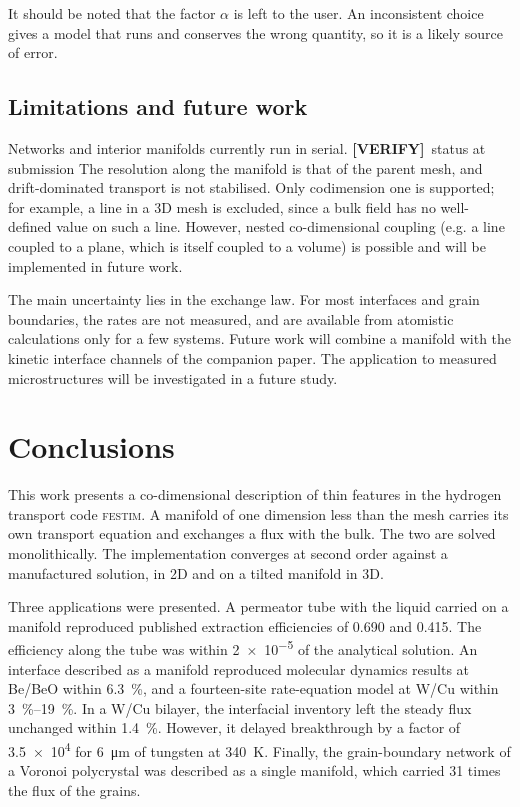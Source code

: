 \documentclass[5p]{elsarticle}
\newcommand{\FESTIM}{\textsc{festim}}
\newcommand{\VERIFY}[1]{\textcolor{RedOrange}{\textbf{[VERIFY]}~#1}}
\begin{document}
It should be noted that the factor $\alpha$ is left to the user.
An inconsistent choice gives a model that runs and conserves the wrong quantity, so it is a likely source of error.

\subsection{Limitations and future work}
\label{sec:discussion:limitations}

Networks and interior manifolds currently run in serial. \VERIFY{status at submission}
The resolution along the manifold is that of the parent mesh, and drift-dominated transport is not stabilised. Only codimension one is supported; for example, a line in a 3D mesh is excluded, since a bulk field has no well-defined value on such a line. However, nested co-dimensional coupling (e.g. a line coupled to a plane, which is itself coupled to a volume) is possible and will be implemented in future work.

The main uncertainty lies in the exchange law.
For most interfaces and grain boundaries, the rates are not measured, and are available from atomistic calculations only for a few systems.
Future work will combine a manifold with the kinetic interface channels of the companion paper.
The application to measured microstructures will be investigated in a future study.

\section{Conclusions}
\label{sec:conclusions}

This work presents a co-dimensional description of thin features in the hydrogen transport code \FESTIM{}.
A manifold of one dimension less than the mesh carries its own transport equation and exchanges a flux with the bulk.
The two are solved monolithically.
The implementation converges at second order against a manufactured solution, in 2D and on a tilted manifold in 3D.

Three applications were presented.
A permeator tube with the liquid carried on a manifold reproduced published extraction efficiencies of \num{0.690} and \num{0.415}.
The efficiency along the tube was within \num{2e-5} of the analytical solution.
An interface described as a manifold reproduced molecular dynamics results at Be/BeO within \qty{6.3}{\percent}, and a fourteen-site rate-equation model at W/Cu within \qtyrange{3}{19}{\percent}.
In a W/Cu bilayer, the interfacial inventory left the steady flux unchanged within \qty{1.4}{\percent}.
However, it delayed breakthrough by a factor of \num{3.5e4} for \qty{6}{\micro\metre} of tungsten at \qty{340}{\kelvin}.
Finally, the grain-boundary network of a Voronoi polycrystal was described as a single manifold, which carried 31 times the flux of the grains.
\end{document}
